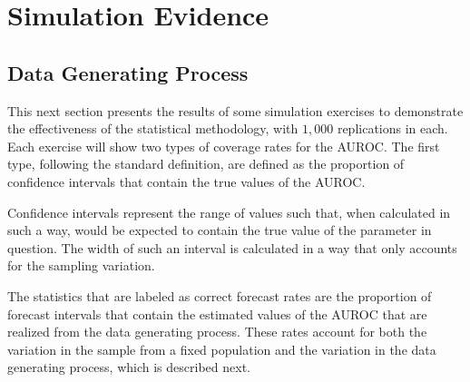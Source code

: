

\section{Simulation Evidence} \label{sec:sims}



\subsection{Data Generating Process}


This next section presents the results of some simulation exercises to demonstrate the effectiveness of the statistical methodology, with $1,000$ replications in each.
%
Each exercise will show two types of coverage rates for the AUROC.
%
The first type, following the standard definition, are defined as the proportion of confidence intervals that contain the true values of the AUROC.

Confidence intervals represent the range of values such that, when calculated in such a way, would be expected to contain the true value of the parameter in question.
The width of such an interval is calculated in a way that only accounts for the sampling variation.

The statistics that are labeled as correct forecast rates are the proportion of forecast intervals that contain the estimated values of the AUROC that are realized from the data generating process.
These rates account for both the variation in the sample from a fixed population and the variation in the data generating process, which is described next.



